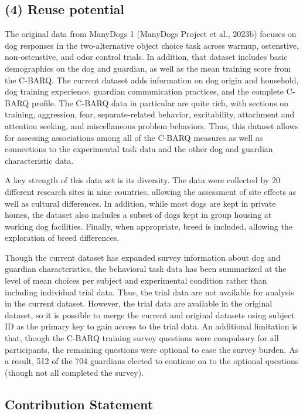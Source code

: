 \documentclass[
  man,floatsintext]{apa6}
\begin{document}
\hypertarget{reuse-potential}{%
\subsection{(4) Reuse potential}\label{reuse-potential}}

The original data from ManyDogs 1 (ManyDogs Project et al., 2023b) focuses on dog responses in the two-alternative object choice task across warmup, ostenstive, non-ostenstive, and odor control trials. In addition, that dataset includes basic demographics on the dog and guardian, as well as the mean training score from the C-BARQ. The current dataset adds information on dog origin and household, dog training experience, guardian communication practices, and the complete C-BARQ profile. The C-BARQ data in particular are quite rich, with sections on training, aggression, fear, separate-related behavior, excitability, attachment and attention seeking, and miscellaneous problem behaviors. Thus, this dataset allows for assessing associations among all of the C-BARQ measures as well as connections to the experimental task data and the other dog and guardian characteristic data.

A key strength of this data set is its diversity. The data were collected by 20 different research sites in nine countries, allowing the assessment of site effects as well as cultural differences. In addition, while most dogs are kept in private homes, the dataset also includes a subset of dogs kept in group housing at working dog facilities. Finally, when appropriate, breed is included, allowing the exploration of breed differences.

Though the current dataset has expanded survey information about dog and guardian characteristics, the behavioral task data has been summarized at the level of mean choices per subject and experimental condition rather than including individual trial data. Thus, the trial data are not available for analysis in the current dataset. However, the trial data are available in the original dataset, so it is possible to merge the current and original datasets using subject ID as the primary key to gain access to the trial data. An additional limitation is that, though the C-BARQ training survey questions were compulsory for all participants, the remaining questions were optional to ease the survey burden. As a result, 512 of the 704 guardians elected to continue on to the optional questions (though not all completed the survey).

\hypertarget{contribution-statement}{%
\subsection{Contribution Statement}\label{contribution-statement}}
\end{document}
